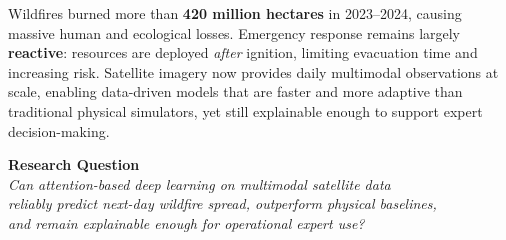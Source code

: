 \documentclass[a0,landscape]{a0poster}
\begin{document}
\noindent
\begin{tcolorbox}[
  enhanced,
  colback=AshLight,
  colframe=FireRed,
  arc=5pt,
  boxrule=2pt,
  left=10pt, right=10pt, top=6pt, bottom=6pt,
  title={\Large\bfseries\color{white} Motivation \& Problem Statement},
  attach boxed title to top left={yshift=-2mm, xshift=8mm},
  boxed title style={colback=FireRed, colframe=FireRed, arc=3pt}
]
\begin{minipage}[t]{0.54\linewidth}
  \vspace{0pt}
  {\small\color{SmokeGrey}%
    Wildfires burned more than \textbf{420 million hectares} in 2023--2024, causing massive human and
    ecological losses. Emergency response remains largely \textbf{reactive}: resources are deployed
    \emph{after} ignition, limiting evacuation time and increasing risk.
    Satellite imagery now provides daily multimodal observations at scale,
    enabling data-driven models that are faster and more adaptive than traditional physical simulators,
    yet still explainable enough to support expert decision-making.%
  }
\end{minipage}
\hfill\vrule width 1.5pt\hfill
\begin{minipage}[t]{0.42\linewidth}
  \vspace{0pt}
  \begin{tcolorbox}[
    colback=DeepBlue!12, colframe=DeepBlue,
    arc=4pt, boxrule=2pt,
    left=6pt, right=6pt, top=5pt, bottom=5pt
  ]
  \begin{center}
    {\large\bfseries\color{DeepBlue} Research Question}\\[0.3em]
    {\normalsize\color{black}%
      \textit{Can attention-based deep learning on multimodal satellite data}\\
      \textit{reliably predict next-day wildfire spread, outperform physical baselines,}\\
      \textit{and remain explainable enough for operational expert use?}%
    }
  \end{center}
  \end{tcolorbox}
\end{minipage}
\end{tcolorbox}

\vspace{0.35cm}
\end{document}
